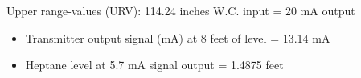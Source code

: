 \vskip 10pt

Upper range-values (URV): 114.24 inches W.C. input = 20 mA output

\vskip 10pt

\begin{itemize}
\item{} Transmitter output signal (mA) at 8 feet of level = 13.14 mA
\item{} Heptane level at 5.7 mA signal output = 1.4875 feet
\end{itemize}











